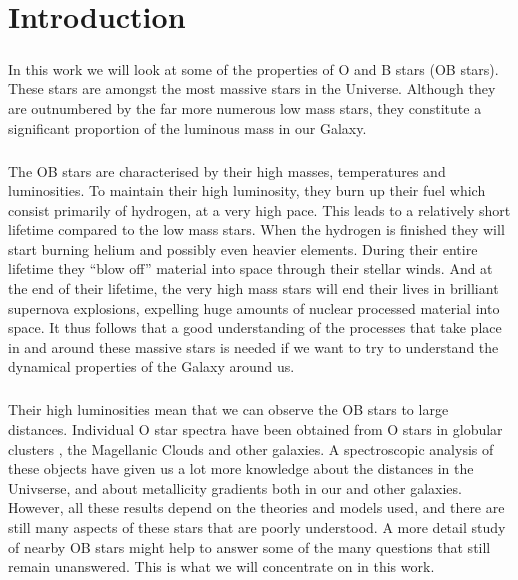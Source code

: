 \chapter{Introduction}


\paragraph{}
In this work we will look at some of the properties of O and B stars 
(OB stars). These
stars are amongst the most massive stars in the Universe. Although they are
outnumbered by the far more numerous low mass stars, they constitute a
significant proportion of the luminous mass in our Galaxy. 

\paragraph{}
The OB stars are characterised by their high masses, temperatures and
luminosities. To maintain their high luminosity, they burn up their fuel
which consist primarily of hydrogen, at a very high pace. This leads to
a relatively short lifetime compared to the low mass stars. When the hydrogen
is finished they will start burning helium and possibly even heavier elements.
During their entire lifetime they ``blow off'' material into space through 
their stellar winds. And at the end of their lifetime, the very high mass 
stars will end
their lives in brilliant supernova explosions, expelling huge amounts of
nuclear processed material into space.
It thus follows
that a good understanding of the processes that take place in and around
these massive stars is needed if we want to try to understand the 
dynamical properties of the Galaxy around us.

\paragraph{}
Their high luminosities mean that we can observe the OB stars to
large distances. Individual O star spectra have been obtained from O
stars in  globular clusters , the Magellanic Clouds
 and other galaxies. A spectroscopic analysis
of these objects have given us a lot more knowledge about the
distances in the Univserse, and about metallicity
gradients both in our and other galaxies. However, all
these results depend on the theories and models used, and there are still many
aspects of these stars that are poorly understood. A more detail study
of nearby OB stars might help to answer some of the many questions that
still remain unanswered. This is what we will concentrate on in this work.

